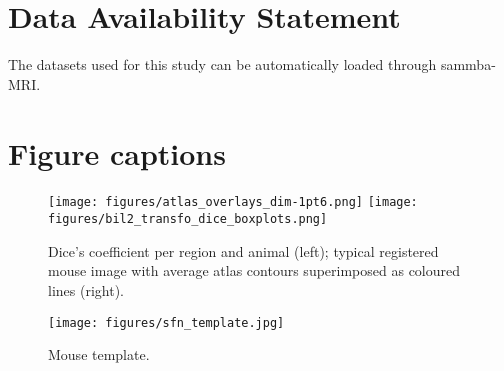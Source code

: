 \documentclass[utf8, a4paper, final, crop]{frontiersSCNS} %
\begin{document}
\section*{Data Availability Statement}

The datasets used for this study can be automatically loaded through sammba-MRI.




\section*{Figure captions}

\begin{figure}[h!]
\begin{center}
\texttt{[image: figures/atlas\_overlays\_dim-1pt6.png]}
\texttt{[image: figures/bil2\_transfo\_dice\_boxplots.png]}
\end{center}
\caption{Dice's coefficient per region and animal (left); typical registered mouse image with average atlas contours superimposed as coloured lines (right).}\label{fig:dices}
\end{figure}

\begin{figure}[h!]
\begin{center}
\texttt{[image: figures/sfn\_template.jpg]}
\end{center}
\caption{Mouse template.}\label{fig:mouse_template}
\end{figure}
\end{document}
